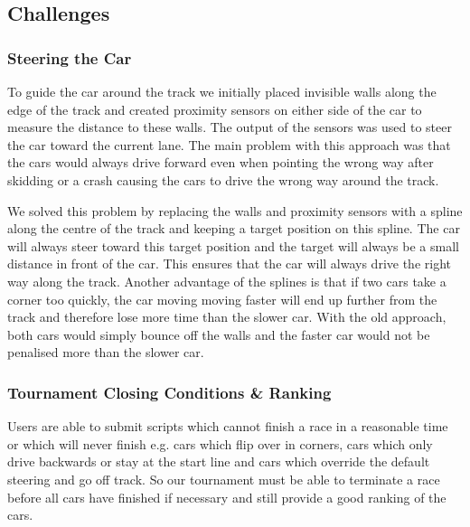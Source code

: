 


\subsection{Challenges}




\subsubsection{Steering the Car}
To guide the car around the track we initially placed invisible walls along the edge of the track and created proximity sensors on either side of the car to measure the distance to these walls. The output of the sensors was used to steer the car toward the current lane. The main problem with this approach was that the cars would always drive forward even when pointing the wrong way after skidding or a crash causing the cars to drive the wrong way around the track.

We solved this problem by replacing the walls and proximity sensors with a spline along the centre of the track and keeping a target position on this spline. The car will always steer toward this target position and the target will always be a small distance in front of the car. This ensures that the car will always drive the right way along the track. Another advantage of the splines is that if two cars take a corner too quickly, the car moving moving faster will end up further from the track and therefore lose more time than the slower car. With the old approach, both cars would simply bounce off the walls and the faster car would not be penalised more than the slower car.

\subsubsection{Tournament Closing Conditions \& Ranking}
Users are able to submit scripts which cannot finish a race in a reasonable time or which will never finish e.g. cars which flip over in corners, cars which only drive backwards or stay at the start line and cars which override the default steering and go off track. So our tournament must be able to terminate a race before all cars have finished if necessary and still provide a good ranking of the cars.

